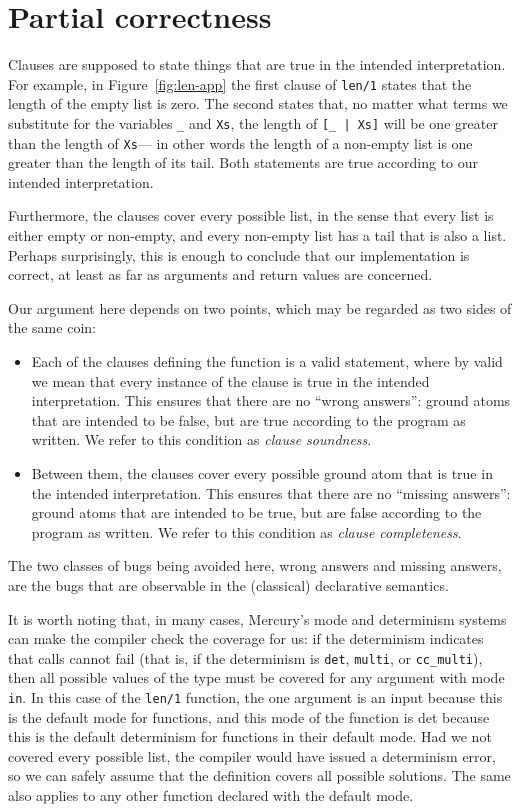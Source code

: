 \section{Partial correctness}
\label{sec:partial-correctness}

Clauses are supposed to state things that are
true in the intended interpretation.
For example,
in Figure~\ref{fig:len-app}
the first clause of \texttt{len/1} states that
the length of the empty list is zero.
The second states that,
no matter what terms we substitute
for the variables \texttt{\_} and \texttt{Xs},
the length of \texttt{[\_~|~Xs]} will be one greater than
the length of \texttt{Xs}---%
in other words the length of a non-empty list
is one greater than the length of its tail.
Both statements are true
according to our intended interpretation.

Furthermore,
the clauses cover every possible list,
in the sense that every list is either empty or non-empty,
and every non-empty list has a tail that is also a list.
Perhaps surprisingly,
this is enough to conclude that our implementation is correct,
at least as far as arguments and return values are concerned.

Our argument here depends on two points,
which may be regarded as two sides of the same coin:
\begin{itemize}
\item
Each of the clauses defining the function is a valid statement,
where by valid we mean that every instance of the clause
is true in the intended interpretation.
This ensures that there are no ``wrong answers\label{gi:wrong-answer}'':
ground atoms that are intended to be false,
but are true according to the program as written.
We refer to this condition as
\emph{clause soundness\label{gi:clause-soundness}}.
\item
Between them,
the clauses cover every possible ground atom
that is true in the intended interpretation.
This ensures that there are no ``missing answers\label{gi:missing-answer}'':
ground atoms that are intended to be true,
but are false according to the program as written.
We refer to this condition as
\emph{clause completeness\label{gi:clause-completeness}}.
\end{itemize}
The two classes of bugs being avoided here,
wrong answers and missing answers,
are the bugs that are observable in
the (classical) declarative semantics.

It is worth noting that, in many cases,
Mercury's mode and determinism systems can
make the compiler check the coverage for us:
if the determinism indicates that calls cannot fail
(that is, if the determinism is
\texttt{det}, \texttt{multi}, or \texttt{cc\_multi}),
then all possible values of the type must be covered
for any argument with mode \texttt{in}.
In this case of the \texttt{len/1} function,
the one argument is an input
because this is the default mode for functions,
and this mode of the function is det
because this is the default determinism
for functions in their default mode.
Had we not covered every possible list,
the compiler would have issued a determinism error,
so we can safely assume that
the definition covers all possible solutions.
The same also applies to any other function declared with
the default mode.

